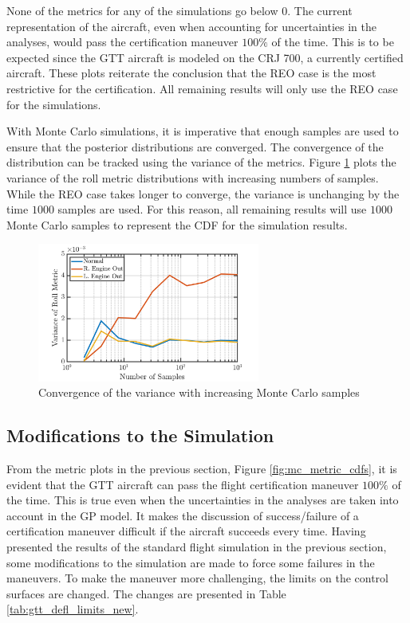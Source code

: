 None of the metrics for any of the simulations go below $0$. 
The current representation of the aircraft, even when accounting for uncertainties in the analyses, would pass the certification maneuver $100\%$ of the time.
This is to be expected since the GTT aircraft is modeled on the CRJ 700, a currently certified aircraft.
These plots reiterate the conclusion that the REO case is the most restrictive for the certification. 
All remaining results will only use the REO case for the simulations. 

With Monte Carlo simulations, it is imperative that enough samples are used to ensure that the posterior distributions are converged.
The convergence of the distribution can be tracked using the variance of the metrics.
Figure \ref{fig:mc_var_conv} plots the variance of the roll metric distributions with increasing numbers of samples.
While the REO case takes longer to converge, the variance is unchanging by the time $1000$ samples are used. 
For this reason, all remaining results will use $1000$ Monte Carlo samples to represent the CDF for the simulation results. 

\begin{figure}
    \center
    \includegraphics[width=0.65\textwidth]{code/image_gen/cba/Stanford_CFR25_147d_2_R2/images/mc_var_convergence.png}
    \caption{Convergence of the variance with increasing Monte Carlo samples \label{fig:mc_var_conv}}
\end{figure}

\subsection{Modifications to the Simulation} \label{subsec:sim_mods}

From the metric plots in the previous section, Figure \ref{fig:mc_metric_cdfs}, it is evident that the GTT aircraft can pass the flight certification maneuver $100\%$ of the time.
This is true even when the uncertainties in the analyses are taken into account in the GP model. 
It makes the discussion of success/failure of a certification maneuver difficult if the aircraft succeeds every time.
Having presented the results of the standard flight simulation in the previous section, some modifications to the simulation are made to force some failures in the maneuvers.
To make the maneuver more challenging, the limits on the control surfaces are changed.
The changes are presented in Table \ref{tab:gtt_defl_limits_new}.

